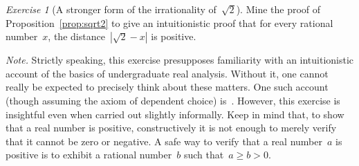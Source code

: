 \documentclass[10pt,reqno,a4paper,openany]{amsbook}
\theoremstyle{definition}
\theoremstyle{plain}
\theoremstyle{remark}
\newcommand{\?}{\,{:}\,}
\renewcommand{\_}{\mathpunct{.}\,}
\newtheorem{exercise}{Exercise}[chapter]
\begin{document}
\begin{exercise}[A stronger form of the irrationality of~$\sqrt{2}$]
\label{ex:sqrt2}
Mine the proof of Proposition~\ref{prop:sqrt2} to give an intuitionistic proof
that for every rational number~$x$, the distance~$|\sqrt{2}-x|$ is positive.

{\noindent\scriptsize\emph{Note.} Strictly speaking, this exercise presupposes
familiarity with an intuitionistic account of the basics of undergraduate real
analysis. Without it, one cannot really be expected to precisely think about
these matters. One such account (though assuming the axiom of dependent choice)
is~\cite{bishop-bridges:bible}. However, this exercise is insightful even when carried out
slightly informally. Keep in mind that, to show that a real number is positive,
constructively it is not enough to merely verify that it cannot be zero or
negative. A safe way to verify that a real number~$a$ is positive is to exhibit
a rational number~$b$ such that~$a \geq b > 0$.\par}
\end{exercise}
\end{document}
